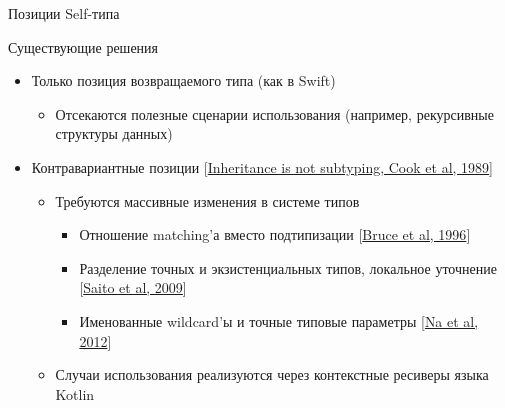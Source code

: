 \documentclass[aspectratio=169,usenames,dvipsnames]{beamer}
\begin{document}
    \begin{frame}{Позиции Self-типа}


        \begin{block}{Существующие решения}
            \begin{itemize}
                \item Только позиция возвращаемого типа (как в Swift)
                \begin{itemize}
                    \item Отсекаются полезные сценарии использования (например, рекурсивные структуры данных)
                \end{itemize}
                \item Контравариантные позиции [\href{https://dl.acm.org/doi/pdf/10.1145/96709.96721}{Inheritance is not subtyping, Cook et al, 1989}]
                \begin{itemize}
                    \item Требуются массивные изменения в системе типов
                    \begin{itemize}
                        \item Отношение matching'а вместо подтипизации [\href{https://www.researchgate.net/profile/Kim-Bruce-2/publication/221496196_Subtyping_Is_Not_a_Good_Match_for_Object-Oriented_Languages/links/09e415122545c6d7a4000000/Subtyping-Is-Not-a-Good-Match-for-Object-Oriented-Languages.pdf}{Bruce et al, 1996}]
                        \item Разделение точных и экзистенциальных типов, локальное уточнение [\href{https://citeseerx.ist.psu.edu/document?repid=rep1&type=pdf&doi=a9d601d3bf8c921748902d58078d0a1b28f6ec4d}{Saito et al, 2009}]
                        \item Именованные wildcard'ы и точные типовые параметры [\href{https://www.researchgate.net/profile/Sukyoung-Ryu/publication/254004584_Exact_type_parameterization_and_ThisType_support/links/54b90ed10cf269d8cbf72d01/Exact-type-parameterization-and-ThisType-support.pdf}{Na et al, 2012}]
                    \end{itemize}
                    \item Случаи использования реализуются через контекстные ресиверы языка Kotlin
                \end{itemize}
            \end{itemize}
        \end{block}


\end{frame}
\end{document}
